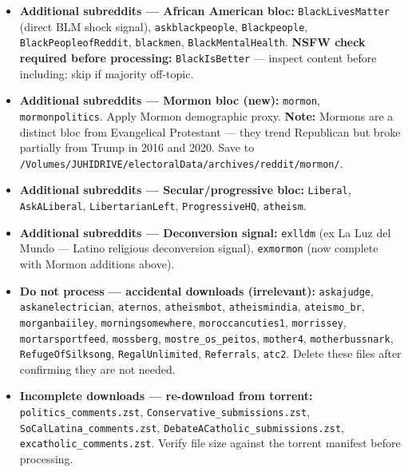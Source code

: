 \documentclass[11pt]{article}
\begin{document}
\begin{taskbox}
{\begin{itemize}[leftmargin=1.6em, itemsep=1pt]
          the registry from 2005 to 2025, so no per-shock Reddit downloads
          are needed.
    \item \textbf{Additional subreddits --- African American bloc:}
          \texttt{BlackLivesMatter} (direct BLM shock signal),
          \texttt{askblackpeople},
          \texttt{Blackpeople},
          \texttt{BlackPeopleofReddit},
          \texttt{blackmen},
          \texttt{BlackMentalHealth}.
          \textbf{NSFW check required before processing:}
          \texttt{BlackIsBetter} --- inspect content before including;
          skip if majority off-topic.
    \item \textbf{Additional subreddits --- Mormon bloc (new):}
          \texttt{mormon},
          \texttt{mormonpolitics}.
          Apply Mormon demographic proxy. \textbf{Note:} Mormons are a
          distinct bloc from Evangelical Protestant --- they trend
          Republican but broke partially from Trump in 2016 and 2020.
          Save to \texttt{/Volumes/JUHIDRIVE/electoralData/archives/reddit/mormon/}.
    \item \textbf{Additional subreddits --- Secular/progressive bloc:}
          \texttt{Liberal},
          \texttt{AskALiberal},
          \texttt{LibertarianLeft},
          \texttt{ProgressiveHQ},
          \texttt{atheism}.
    \item \textbf{Additional subreddits --- Deconversion signal:}
          \texttt{exlldm} (ex La Luz del Mundo --- Latino religious
          deconversion signal),
          \texttt{exmormon} (now complete with Mormon additions above).
    \item \textbf{Do not process --- accidental downloads (irrelevant):}
          \texttt{askajudge},
          \texttt{askanelectrician},
          \texttt{aternos},
          \texttt{atheismbot},
          \texttt{atheismindia},
          \texttt{ateismo\_br},
          \texttt{morganbaiiley},
          \texttt{morningsomewhere},
          \texttt{moroccancuties1},
          \texttt{morrissey},
          \texttt{mortarsportfeed},
          \texttt{mossberg},
          \texttt{mostre\_os\_peitos},
          \texttt{mother4},
          \texttt{motherbussnark},
          \texttt{RefugeOfSilksong},
          \texttt{RegalUnlimited},
          \texttt{Referrals},
          \texttt{atc2}.
          Delete these files after confirming they are not needed.
    \item \textbf{Incomplete downloads --- re-download from torrent:}
          \texttt{politics\_comments.zst},
          \texttt{Conservative\_submissions.zst},
          \texttt{SoCalLatina\_comments.zst},
          \texttt{DebateACatholic\_submissions.zst},
          \texttt{excatholic\_comments.zst}.
          Verify file size against the torrent manifest before processing.
  \end{itemize}

}
\end{taskbox}
\end{document}
